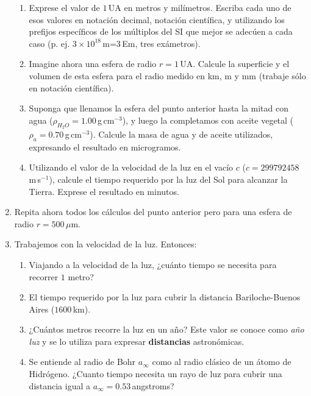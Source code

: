 \documentclass[a4paper,12pt]{article}
\begin{document}
\begin{enumerate}
\begin{enumerate}
\item Exprese el valor de $1$\,UA en metros y
milímetros. Escriba cada uno de esos valores en notación decimal, notación
científica, y utilizando los prefijos específicos de los múltiplos del SI que
mejor se adecúen a cada caso (p. ej. $3\times10^{18}$\,m=3\,Em, tres
exámetros).  \item Imagine ahora una esfera de radio $r=1$\,UA. Calcule la
superficie y el volumen de esta esfera para el radio medido en km, m y mm
(trabaje sólo en notación científica).
\item Suponga que llenamos la esfera del punto anterior hasta la mitad con agua
($\rho_{H_2O} = 1.00$\,g\,cm$^{-3}$), y luego la completamos con aceite vegetal
($\rho_{a} = 0.70$\,g\,cm$^{-3}$). Calcule la masa de agua y de aceite
utilizados, expresando el resultado en microgramos.
\item Utilizando el valor de la velocidad de la luz en el vacío $c$ ($c=299 792
458$\,m\,s$^{-1}$), calcule el tiempo requerido por la luz del Sol para
alcanzar la Tierra. Exprese el resultado en minutos. 
\end{enumerate}

\item Repita ahora todos los cálculos del punto anterior pero para una esfera
de radio $r=500$\,$\mu$m. 

\item Trabajemos con la velocidad de la luz. Entonces:

\begin{enumerate}
\item Viajando a la velocidad de la luz, ¿cuánto tiempo se necesita para
	recorrer $1$ metro? 
\item El tiempo requerido por la luz para cubrir la distancia Bariloche-Buenos
	Aires ($1600$\,km).
\item ¿Cuántos metros recorre la luz en un año? Este valor se conoce como
	{\emph{año luz}} y se lo utiliza para expresar {\bf{distancias}}
	astronómicas.
\item Se entiende al radio de Bohr $a_\infty$ como al radio clásico de un átomo
	de Hidrógeno. ¿Cuanto tiempo necesita un rayo de luz para cubrir una
	distancia igual a $a_\infty=0.53$\,angstroms? 
\end{enumerate}
\end{enumerate}
\end{document}
